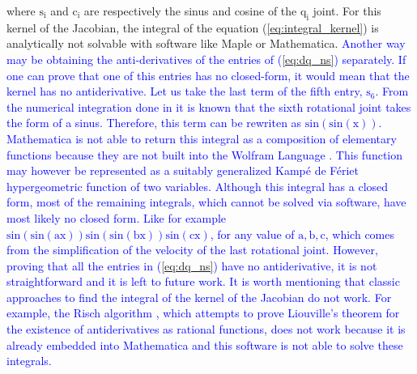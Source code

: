 where $\mathrm{s_i}$ and $\mathrm{c_i}$ are respectively the sinus and cosine of the $\mathrm{q_i}$ joint. For this kernel of the Jacobian, the integral of the equation (\ref{eq:integral_kernel}) is analytically not solvable with software like Maple or Mathematica. 
\textcolor{blue}{Another way may be obtaining the anti-derivatives of the entries of (\ref{eq:dq_ns}) separately. If one can prove that one of this entries has no closed-form, it would mean that the kernel has no antiderivative. Let us take the last term of the fifth entry, $\mathrm{s_6}$. From the numerical integration done in  \cite{fabianthesis} it is known that the sixth rotational joint takes the form of a sinus. Therefore, this term can be rewriten as $\mathrm{\mathrm{sin(sin(x))}}$.  
Mathematica is not able to return this integral as a composition of elementary functions because they are not built into the Wolfram Language \cite{wolfram}. This function may however be represented as a suitably generalized Kampé de Fériet hypergeometric function \cite{kampe} of two variables. Although this integral has a closed form, most of the remaining integrals, which cannot be solved via software, have most likely no closed form. Like for example $\mathrm{sin(sin(ax))sin(sin(bx))sin(cx)}$, for any value of $\mathrm{a,b,c}$, which comes from the simplification of the velocity of the last rotational joint. However, proving that all the entries in (\ref{eq:dq_ns}) have no antiderivative, it is not straightforward and it is left to future work. It is worth mentioning that classic approaches to find the integral of the kernel of the Jacobian do not work. For example, the Risch algorithm \cite{risch}, which attempts to prove Liouville's theorem \cite{lioville} for the existence of antiderivatives as rational functions, does not work because it is already embedded into Mathematica and this software is not able to solve these integrals.}
 
